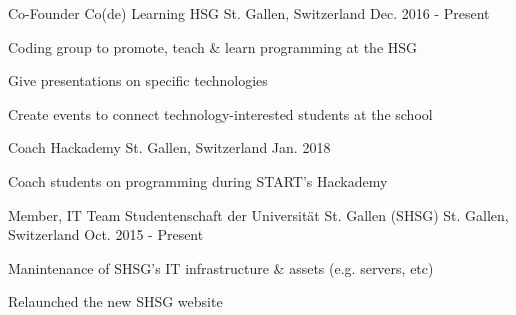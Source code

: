 

\begin{cventries}

  \cventry
    {Co-Founder} %
    {Co(de) Learning HSG} %
    {St. Gallen, Switzerland} %
    {Dec. 2016 - Present} %
    {
      \begin{cvitems} %
        \item {Coding group to promote, teach \& learn programming at the HSG}
        \item {Give presentations on specific technologies}
        \item {Create events to connect technology-interested students at the school}
      \end{cvitems}
    }

    \cventry
      {Coach} %
      {Hackademy} %
      {St. Gallen, Switzerland} %
      {Jan. 2018} %
      {
        \begin{cvitems} %
          \item {Coach students on programming during START's Hackademy}
        \end{cvitems}
      }

  \cventry
    {Member, IT Team} %
    {Studentenschaft der Universität St. Gallen (SHSG)} %
    {St. Gallen, Switzerland} %
    {Oct. 2015 - Present} %
    {
      \begin{cvitems} %
        \item {Manintenance of SHSG's IT infrastructure \& assets (e.g. servers, etc)}
        \item {Relaunched the new SHSG website}
      \end{cvitems}
    }


\end{cventries}
